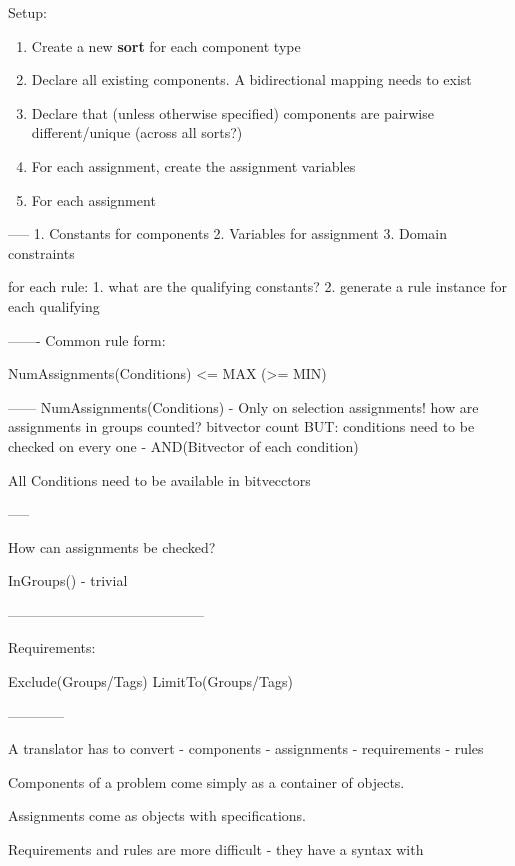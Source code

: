 Setup:

\begin{enumerate}

\item Create a new \textbf{sort} for each component type

\item Declare all existing components. A bidirectional mapping needs to exist

\item Declare that (unless otherwise specified) components are pairwise different/unique (across all sorts?)

\item For each assignment, create the assignment variables

\item For each assignment
\end{enumerate}

   

-----
1. Constants for components
2. Variables for assignment
3. Domain constraints

for each rule:
1. what are the qualifying constants?
2. generate a rule instance for each qualifying

-------
Common rule form:

NumAssignments(Conditions) <= MAX (>= MIN)



------
NumAssignments(Conditions) - Only on selection assignments!
how are assignments in groups counted?
bitvector count
BUT: conditions need to be checked on every one - 
AND(Bitvector of each condition)

All Conditions need to be available in bitvecctors



-----

How can assignments be checked?

InGroups() - trivial


------------------------------------------

Requirements:

Exclude(Groups/Tags)
LimitTo(Groups/Tags)

------------

A translator has to convert
- components
- assignments
- requirements
- rules

Components of a problem come simply as a container of objects.

Assignments come as objects with specifications.

Requirements and rules are more difficult - they have a syntax with 

